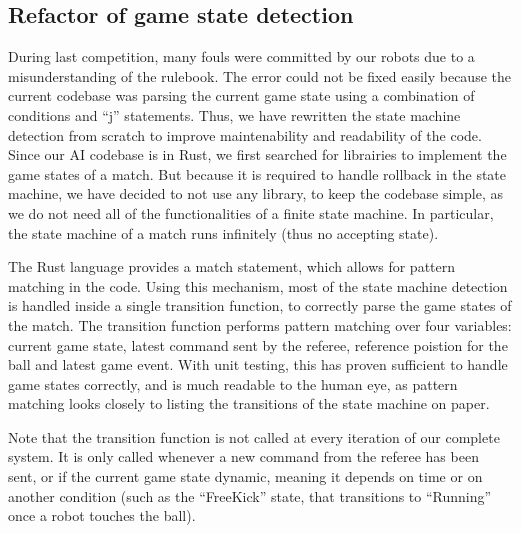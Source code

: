 \subsection{Refactor of game state detection}
During last competition, many fouls were committed by our robots due to a
misunderstanding of the rulebook. The error could not be fixed easily because
the current codebase was parsing the current game state using a combination of conditions and ``j'' statements.
Thus, we have rewritten the state machine detection from scratch to improve maintenability
and readability of the code. Since our AI codebase is in Rust, we first searched for
librairies to implement the game states of a match. But because it is required
to handle rollback in the state machine, we have decided to not use any library,
to keep the codebase simple, as we do not need all of the functionalities of a finite state machine.
In particular, the state machine of a match runs infinitely (thus no accepting state).

The Rust language provides a match statement, which allows for pattern matching in the code.
Using this mechanism, most of the state machine detection is handled inside a single transition function, 
to correctly parse the game states of the match. The transition function performs pattern matching over four variables:
current game state, latest command sent by the referee, reference poistion for the ball and latest
game event. With unit testing, this has proven sufficient to handle game states correctly,
and is much readable to the human eye, as pattern matching looks closely to listing the transitions
of the state machine on paper.

Note that the transition function is not called at every iteration of our complete system.
It is only called whenever a new command from the referee has been sent, or if the current
game state dynamic, meaning it depends on time or on another condition (such as the ``FreeKick'' state,
that transitions to ``Running'' once a robot touches the ball).